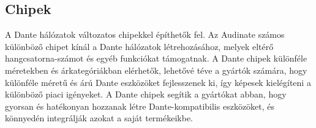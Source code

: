 \subsection{Chipek}

A Dante hálózatok változatos chipekkel építhetők fel. 
Az Audinate számos különböző chipet kínál a Dante hálózatok létrehozásához, 
melyek eltérő hangcsatorna-számot és egyéb funkciókat támogatnak. 
A Dante chipek különféle méretekben és árkategóriákban elérhetők, 
lehetővé téve a gyártók számára, hogy különféle méretű és árú Dante 
eszközöket fejlesszenek ki, így képesek kielégíteni a különböző piaci igényeket. 
A Dante chipek segítik a gyártókat abban, hogy gyorsan és hatékonyan hozzanak 
létre Dante-kompatibilis eszközöket, és könnyedén integrálják azokat a saját termékeikbe.

